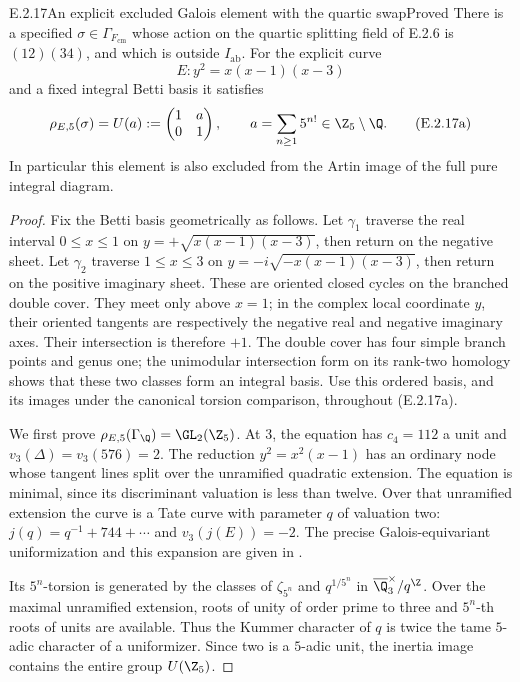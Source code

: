 \begin{result}{E.2.17}{An explicit excluded Galois element with the quartic swap}{Proved}
There is a specified \(\sigma\in\Gamma_{F_{\mathrm{cm}}}\)
whose action on the quartic splitting field of E.2.6 is
\((12)(34)\), and which is outside \(I_{\mathrm{ab}}\).
For the explicit curve
\[
 E:y^2=x(x-1)(x-3)
\]
and a fixed integral Betti basis it satisfies
\[
 \rho_{E,5}(\sigma)=
 U(a):=\begin{pmatrix}1&a\\0&1\end{pmatrix},
 \qquad a=\sum_{n\ge1}5^{n!}\in\Z_5\setminus\Q .
 \tag{E.2.17a}
\]
In particular this element is also excluded from the Artin
image of the full pure integral diagram.
\end{result}
\begin{proof}
Fix the Betti basis geometrically as follows. Let \(\gamma_1\)
traverse the real interval \(0\le x\le1\) on
\(y=+\sqrt{x(x-1)(x-3)}\), then return on the negative
sheet. Let \(\gamma_2\) traverse \(1\le x\le3\) on
\(y=-i\sqrt{-x(x-1)(x-3)}\), then return on the positive
imaginary sheet. These are oriented closed cycles on the
branched double cover. They meet only above \(x=1\); in
the complex local coordinate \(y\), their oriented tangents
are respectively the negative real and negative imaginary
axes. Their intersection is therefore \(+1\).
The double cover has four simple branch points and genus
one; the unimodular intersection form on its rank-two
homology shows that these two classes form an integral
basis. Use this ordered basis, and its images under the
canonical torsion comparison, throughout (E.2.17a).

We first prove
\(\rho_{E,5}(\Gamma_{\Q})=\GL_2(\Z_5)\).
At \(3\), the equation has \(c_4=112\) a unit and
\(v_3(\Delta)=v_3(576)=2\).
The reduction \(y^2=x^2(x-1)\) has an ordinary node whose
tangent lines split over the unramified quadratic extension.
The equation is minimal, since its discriminant valuation is
less than twelve. Over that unramified extension the curve
is a Tate curve with parameter \(q\) of valuation two:
\(j(q)=q^{-1}+744+\cdots\) and \(v_3(j(E))=-2\).
The precise Galois-equivariant uniformization and this
expansion are given in \cite[Section19, p.44]{GenConradTate}.

Its \(5^n\)-torsion is generated by the classes of
\(\zeta_{5^n}\) and \(q^{1/5^n}\) in
\(\overline{\Q}_3^\times/q^\Z\).
Over the maximal unramified extension, roots of unity of
order prime to three and \(5^n\)-th roots of units are
available. Thus the Kummer character of \(q\) is twice
the tame \(5\)-adic character of a uniformizer.
Since two is a \(5\)-adic unit, the inertia image contains
the entire group \(U(\Z_5)\).


\end{proof}
